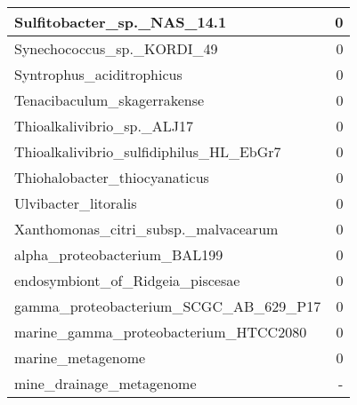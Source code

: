 \documentclass[12pt,a4paper]{article}
\begin{document}
\begin{table}[ht]
\begin{center}
\begin{tabular}{|l*{1}{|r}|}
Sulfitobacter\_sp.\_NAS\_14.1 & 0 \\ \hline
Synechococcus\_sp.\_KORDI\_49 & 0 \\ \hline
Syntrophus\_aciditrophicus & 0 \\ \hline
Tenacibaculum\_skagerrakense & 0 \\ \hline
Thioalkalivibrio\_sp.\_ALJ17 & 0 \\ \hline
Thioalkalivibrio\_sulfidiphilus\_HL\_EbGr7 & 0 \\ \hline
Thiohalobacter\_thiocyanaticus & 0 \\ \hline
Ulvibacter\_litoralis & 0 \\ \hline
Xanthomonas\_citri\_subsp.\_malvacearum & 0 \\ \hline
alpha\_proteobacterium\_BAL199 & 0 \\ \hline
endosymbiont\_of\_Ridgeia\_piscesae & 0 \\ \hline
gamma\_proteobacterium\_SCGC\_AB\_629\_P17 & 0 \\ \hline
marine\_gamma\_proteobacterium\_HTCC2080 & 0 \\ \hline
marine\_metagenome & 0 \\ \hline
mine\_drainage\_metagenome & - \\ \hline
\end{tabular}
\end{center}
\end{table}
\end{document}
